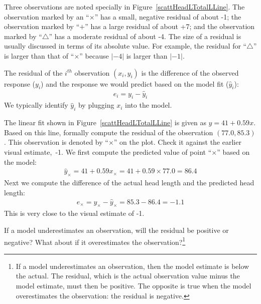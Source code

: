 Three observations are noted specially in Figure~\ref{scattHeadLTotalLLine}. The observation marked by an ``$\times$'' has a small, negative residual of about -1; the observation marked by ``$+$'' has a large residual of about +7; and the observation marked by ``$\triangle$'' has a moderate residual of about -4. The size of a residual is usually discussed in terms of its absolute value. For example, the residual for ``$\triangle$'' is larger than that of ``$\times$'' because $|-4|$ is larger than $|-1|$.

\begin{termBox}{
The residual of the $i^{th}$ observation $(x_i, y_i)$ is the difference of the observed response ($y_i$) and the response we would predict based on the model fit ($\hat{y}_i$):
\begin{eqnarray*}
e_i = y_i - \hat{y}_i
\end{eqnarray*}
We typically identify $\hat{y}_i$ by plugging $x_i$ into the model.}
\end{termBox}

\begin{example}{The linear fit shown in Figure~\ref{scattHeadLTotalLLine} is given as $\hat{y} = 41 + 0.59x$. Based on this line, formally compute the residual of the observation $(77.0, 85.3)$. This observation is denoted by ``$\times$'' on the plot. Check it against the earlier visual estimate,~-1.}
We first compute the predicted value of point ``$\times$'' based on the model:
\begin{eqnarray*}
\hat{y}_{\times} = 41+0.59x_{\times} = 41+0.59\times 77.0 = 86.4
\end{eqnarray*}
Next we compute the difference of the actual head length and the predicted head length:
\begin{eqnarray*}
e_{\times} = y_{\times} - \hat{y}_{\times} = 85.3 -  86.4 = -1.1
\end{eqnarray*}
This is very close to the visual estimate of -1.
\end{example}

\begin{exercise}
If a model underestimates an observation, will the residual be positive or negative? What about if it overestimates the observation?\footnote{If a model underestimates an observation, then the model estimate is below the actual. The residual, which is the actual observation value minus the model estimate, must then be positive. The opposite is true when the model overestimates the observation: the residual is negative.}
\end{exercise}

